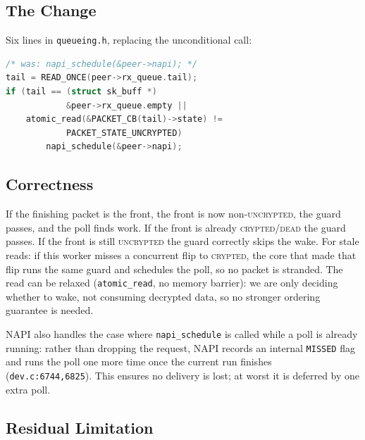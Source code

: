 \documentclass{article}
\begin{document}
\subsection{The Change}

Six lines in \texttt{queueing.h}, replacing the unconditional call:

\begin{lstlisting}[language=C]
/* was: napi_schedule(&peer->napi); */
tail = READ_ONCE(peer->rx_queue.tail);
if (tail == (struct sk_buff *)
            &peer->rx_queue.empty ||
    atomic_read(&PACKET_CB(tail)->state) !=
            PACKET_STATE_UNCRYPTED)
        napi_schedule(&peer->napi);
\end{lstlisting}

\subsection{Correctness}

If the finishing packet is the front, the front is now non-\textsc{uncrypted},
the guard passes, and the poll finds work. If the front is already
\textsc{crypted}/\textsc{dead} the guard passes. If the front is still
\textsc{uncrypted} the guard correctly skips the wake. For stale reads: if this
worker misses a concurrent flip to \textsc{crypted}, the core that made that
flip runs the same guard and schedules the poll, so no packet is stranded. The
read can be relaxed (\texttt{atomic\_read}, no memory barrier): we are only
deciding whether to wake, not consuming decrypted data, so no stronger ordering
guarantee is needed.

NAPI also handles the case where \texttt{napi\_schedule} is called while a poll
is already running: rather than dropping the request, NAPI records an internal
\texttt{MISSED} flag and runs the poll one more time once the current run
finishes (\texttt{dev.c:6744,6825}). This ensures no delivery is lost; at worst
it is deferred by one extra poll.

\subsection{Residual Limitation}
\end{document}
